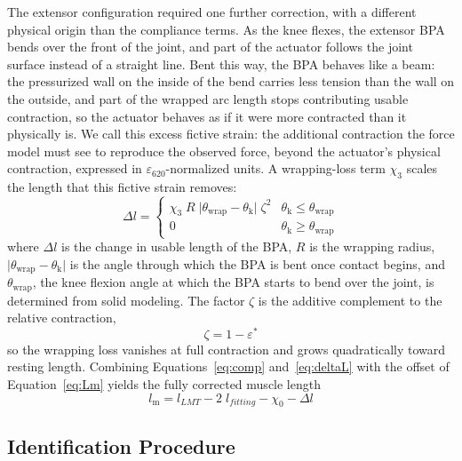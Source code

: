 \documentclass[utf8]{FrontiersinHarvard} %
\providecommand{\abs}[1]{\lvert#1\rvert}
\begin{document}
The extensor configuration required one further correction, with a different physical origin than the compliance terms. As the knee flexes, the extensor BPA bends over the front of the joint, and part of the actuator follows the joint surface instead of a straight line. Bent this way, the BPA behaves like a beam: the pressurized wall on the inside of the bend carries less tension than the wall on the outside, and part of the wrapped arc length stops contributing usable contraction, so the actuator behaves as if it were more contracted than it physically is. We call this excess fictive strain: the additional contraction the force model must see to reproduce the observed force, beyond the actuator's physical contraction, expressed in $\varepsilon_{620}$-normalized units. A wrapping-loss term $\chi_{3}$ scales the length that this fictive strain removes:
\begin{equation}
    \Delta l = \begin{cases}
     \chi_{3}\;R\;\abs{ \theta_\text{wrap}-\theta_\text{k}}\;\zeta^2 & \theta_\text{k} \leq      \theta_\text{wrap} \\
      0 & \theta_\text{k} \geq      \theta_\text{wrap}
     \end{cases}\label{eq:deltaL}
\end{equation}
where $\Delta l$ is the change in usable length of the BPA, $R$ is the wrapping radius, $\abs{\theta_\text{wrap}-\theta_\text{k}}$ is the angle through which the BPA is bent once contact begins, and $\theta_\text{wrap}$, the knee flexion angle at which the BPA starts to bend over the joint, is determined from solid modeling. The factor $\zeta$ is the additive complement to the relative contraction,
\begin{equation}
    \zeta = 1-\varepsilon^*
\label{eq:comp}
\end{equation}
so the wrapping loss vanishes at full contraction and grows quadratically toward resting length. Combining Equations~\eqref{eq:comp} and~\eqref{eq:deltaL} with the offset of Equation~\eqref{eq:Lm} yields the fully corrected muscle length
\begin{equation}
    l_\text{m} = l_{LMT} - 2\;l_{fitting}  - \chi_{0} - \Delta l\label{eq:x3}
\end{equation}

\subsection{Identification Procedure}\label{sec:identification}
\end{document}
